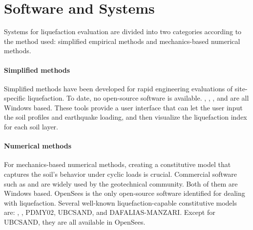 \section{Software and Systems}
\label{sec:eq_liq_tools}

Systems for liquefaction evaluation are divided into two categories according to the method used: simplified empirical methods and mechanics-based numerical methods.

\paragraph{Simplified methods}
Simplified methods have been developed for rapid engineering evaluations of site-specific liquefaction. To date, no open-source software is available. , , , and  are all Windows based. These tools provide a user interface that can let the user input the soil profiles and earthquake loading, and then visualize the liquefaction index for each soil layer.

\paragraph{Numerical methods}
For mechanics-based numerical methods, creating a constitutive model that captures the soil's behavior under cyclic loads is crucial. Commercial software such as  and  are widely used by the geotechnical community. Both of them are Windows based. OpenSees is the only open-source software identified for dealing with liquefaction. Several well-known liquefaction-capable constitutive models are: , , PDMY02, UBCSAND, and DAFALIAS-MANZARI. Except for UBCSAND, they are all available in OpenSees.
